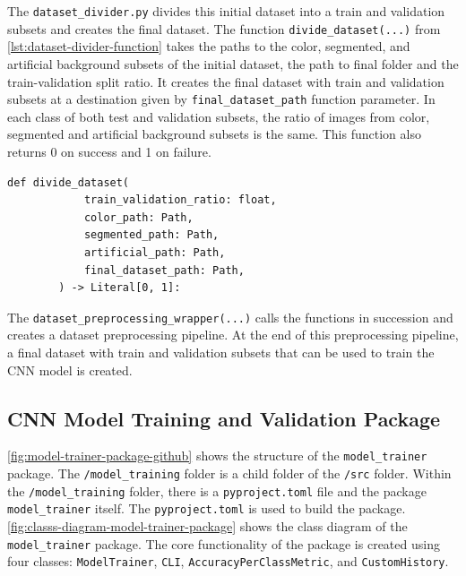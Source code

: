 \documentclass{BachelorBUI}
\begin{document}
        The \verb|dataset_divider.py| divides this initial dataset into a train and validation subsets and creates the final dataset. The function \verb|divide_dataset(...)| from \autoref{lst:dataset-divider-function} takes the paths to the color, segmented, and artificial background subsets of the initial dataset, the path to final folder and the train-validation split ratio. It creates the final dataset with train and validation subsets at a destination given by \verb|final_dataset_path| function parameter. In each class of both test and validation subsets, the ratio of images from color, segmented and artificial background subsets is the same. This function also returns 0 on success and 1 on failure.
        \begin{lstlisting}[caption={\centering Signature of the function defined in dataset\_divider.py}, label={lst:dataset-divider-function}, captionpos=b]
        def divide_dataset(
            train_validation_ratio: float,
            color_path: Path,
            segmented_path: Path,
            artificial_path: Path,
            final_dataset_path: Path,
        ) -> Literal[0, 1]:
        \end{lstlisting}

        The \verb|dataset_preprocessing_wrapper(...)| calls the functions in succession and creates a dataset preprocessing pipeline. At the end of this preprocessing pipeline, a final dataset with train and validation subsets that can be used to train the CNN model is created.

    \subsection{CNN Model Training and Validation Package}

        \autoref{fig:model-trainer-package-github} shows the structure of the \verb|model_trainer| package. The \verb|/model_training| folder is a child folder of the \verb|/src| folder. Within the \verb|/model_training| folder, there is a \verb|pyproject.toml| file and the package \verb|model_trainer| itself. The \verb|pyproject.toml| is used to build the package. \autoref{fig:classs-diagram-model-trainer-package} shows the class diagram of the \verb|model_trainer| package. The core functionality of the package is created using four classes: \verb|ModelTrainer|, \verb|CLI|, \verb|AccuracyPerClassMetric|, and \verb|CustomHistory|.
\end{document}
